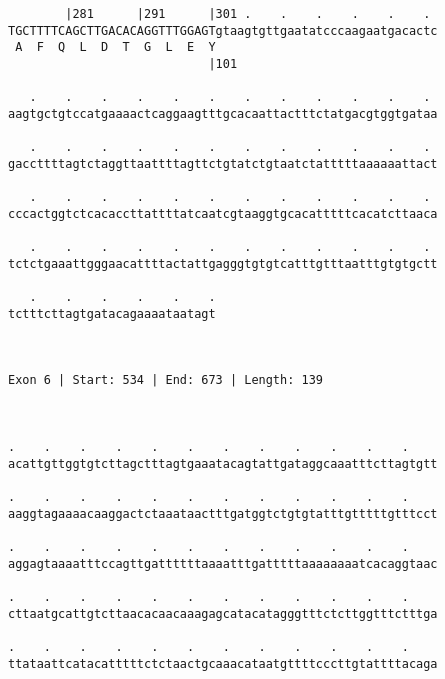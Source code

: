 \documentclass{article}
\begin{document}
\begin{Verbatim}
        |281      |291      |301 .    .    .    .    .    . 
TGCTTTTCAGCTTGACACAGGTTTGGAGTgtaagtgttgaatatcccaagaatgacactc
 A  F  Q  L  D  T  G  L  E  Y                               
                            |101                            
  
   .    .    .    .    .    .    .    .    .    .    .    . 
aagtgctgtccatgaaaactcaggaagtttgcacaattactttctatgacgtggtgataa
                                                            
   .    .    .    .    .    .    .    .    .    .    .    . 
gaccttttagtctaggttaattttagttctgtatctgtaatctatttttaaaaaattact
                                                            
   .    .    .    .    .    .    .    .    .    .    .    . 
cccactggtctcacaccttattttatcaatcgtaaggtgcacatttttcacatcttaaca
                                                            
   .    .    .    .    .    .    .    .    .    .    .    . 
tctctgaaattgggaacattttactattgagggtgtgtcatttgtttaatttgtgtgctt
                                                            
   .    .    .    .    .    .
tctttcttagtgatacagaaaataatagt
                             
                             
 
Exon 6 | Start: 534 | End: 673 | Length: 139



.    .    .    .    .    .    .    .    .    .    .    .    
acattgttggtgtcttagctttagtgaaatacagtattgataggcaaatttcttagtgtt
                                                            
.    .    .    .    .    .    .    .    .    .    .    .    
aaggtagaaaacaaggactctaaataactttgatggtctgtgtatttgtttttgtttcct
                                                            
.    .    .    .    .    .    .    .    .    .    .    .    
aggagtaaaatttccagttgattttttaaaatttgatttttaaaaaaaatcacaggtaac
                                                            
.    .    .    .    .    .    .    .    .    .    .    .    
cttaatgcattgtcttaacacaacaaagagcatacatagggtttctcttggtttctttga
                                                            
.    .    .    .    .    .    .    .    .    .    .    .    
ttataattcatacatttttctctaactgcaaacataatgttttcccttgtattttacaga
                                                            

\end{Verbatim}
\end{document}
